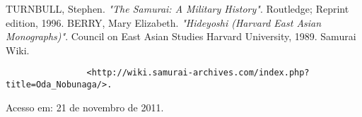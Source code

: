 \documentclass[12pt, a4paper]{article}
\begin{document}
    \begin{thebibliography}{4}
            \uppercase{turnbull}, Stephen.
            \emph{"The Samurai: A Military History"}.
            Routledge; Reprint edition,
            1996.
            \uppercase{berry}, Mary Elizabeth.
            \emph{"Hideyoshi (Harvard East Asian Monographs)"}.
            Council on East Asian Studies Harvard University,
            1989.
            Samurai Wiki.
            \begin{verbatim}
				<http://wiki.samurai-archives.com/index.php?title=Oda_Nobunaga/>.
			\end{verbatim}
            Acesso em: 21 de novembro de 2011.
    \end{thebibliography}
\end{document}
